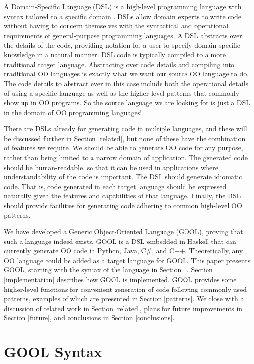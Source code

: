 \documentclass[sigplan,review,anonymous]{acmart}\settopmatter{printfolios=true,printccs=false,printacmref=false}
\begin{document}
A Domain-Specific Language (DSL) is a high-level programming language with 
syntax tailored to a specific domain \cite{DSLs}. DSLs allow domain experts 
to write code without having to concern themselves with the syntactical and
operational requirements of general-purpose programming languages. A DSL
abstracts over the details of the code, providing notation for a user to
specify domain-specific knowledge in a natural manner. DSL code is typically
compiled to a more traditional target language. Abstracting over code details
and compiling into traditional OO languages is exactly what we want our source
OO language to do. The code details to abstract over in this case include both
the operational details of using a specific language as well as the higher-level
patterns that commonly show up in OO programs. So the source language we are
looking for is just a DSL in the domain of OO programming languages!

There are DSLs already for generating code in multiple languages, and these 
will be discussed further in Section \ref{related}, but none of these have the 
combination of features we require. We should be able to generate OO code for 
any purpose, rather than being limited to a narrow domain of application. The 
generated code should be human-readable, so that it can be used in applications 
where understandability of the code is important. The DSL should generate 
idiomatic code. That is, code generated in each target language should be 
expressed naturally given the features and capabilities of that language. 
Finally, the DSL should provide facilities for generating code adhering to 
common high-level OO patterns. 

We have developed a Generic Object-Oriented Language (GOOL), proving that such 
a language indeed exists. GOOL is a DSL embedded in Haskell that can currently
generate OO code in Python, Java, C\#, and C++. Theoretically, any OO language 
could be added as a target language for GOOL. This paper presents GOOL, 
starting with the syntax of the language in Section \ref{syntax}. Section 
\ref{implementation} describes how GOOL is implemented. GOOL provides some 
higher-level functions for convenient generation of code following commonly 
used patterns, examples of which are presented in Section \ref{patterns}. We 
close with a discussion of related work in Section \ref{related}, plans for 
future improvements in Section \ref{future}, and conclusions in Section 
\ref{conclusions}.

\section{GOOL Syntax} \label{syntax}
\end{document}
